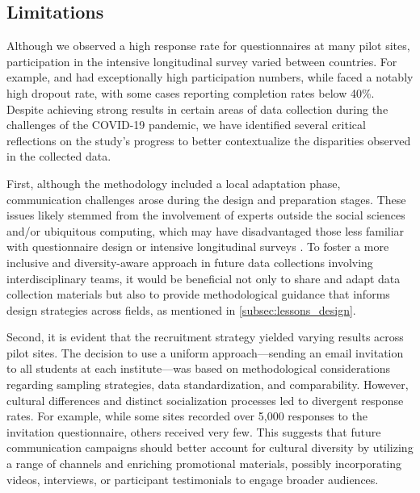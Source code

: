 \subsection{Limitations}\label{sec:limits}

Although we observed a high response rate for questionnaires at many pilot sites, participation in the intensive longitudinal survey varied between countries. For example, \UNITN and \NUM had exceptionally high participation numbers, while \AMRITA faced a notably high dropout rate, with some cases reporting completion rates below 40\%. Despite achieving strong results in certain areas of data collection during the challenges of the COVID-19 pandemic, we have identified several critical reflections on the study's progress to better contextualize the disparities observed in the collected data.

First, although the methodology included a local adaptation phase, communication challenges arose during the design and preparation stages. These issues likely stemmed from the involvement of experts outside the social sciences and/or ubiquitous computing, which may have disadvantaged those less familiar with questionnaire design or intensive longitudinal surveys \cite{helm2023diversity}. To foster a more inclusive and diversity-aware approach in future data collections involving interdisciplinary teams, it would be beneficial not only to share and adapt data collection materials but also to provide methodological guidance that informs design strategies across fields, as mentioned in \cref{subsec:lessons_design}. 

Second, it is evident that the recruitment strategy yielded varying results across pilot sites. The decision to use a uniform approach—sending an email invitation to all students at each institute—was based on methodological considerations regarding sampling strategies, data standardization, and comparability. However, cultural differences and distinct socialization processes led to divergent response rates. For example, while some sites recorded over 5,000 responses to the invitation questionnaire, others received very few. This suggests that future communication campaigns should better account for cultural diversity by utilizing a range of channels and enriching promotional materials, possibly incorporating videos, interviews, or participant testimonials to engage broader audiences.

